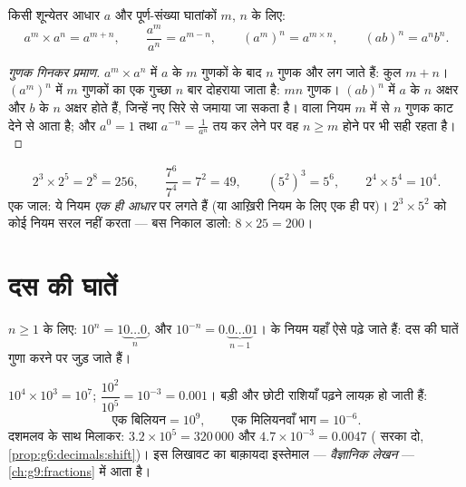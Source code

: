 \begin{theorem}[घातांक के नियम]\label{thm:g8:powers:rules}
किसी शून्येतर आधार $a$ और पूर्ण-संख्या घातांकों $m$, $n$ के लिए:
\[
a^m \times a^n = a^{m+n},
\qquad
\frac{a^m}{a^n} = a^{m-n},
\qquad
\left(a^m\right)^n = a^{m \times n},
\qquad
(ab)^n = a^n b^n .
\]
\end{theorem}

\begin{proof}[गुणक गिनकर प्रमाण]
$a^m \times a^n$ में $a$ के $m$ गुणकों के बाद $n$ गुणक और लग जाते
हैं: कुल $m + n$। $\left(a^m\right)^n$ में $m$ गुणकों का एक गुच्छा
$n$ बार दोहराया जाता है: $mn$ गुणक। $(ab)^n$ में $a$ के $n$ अक्षर
और $b$ के $n$ अक्षर होते हैं, जिन्हें नए सिरे से जमाया जा सकता है।
 वाला नियम $m$ में से $n$ गुणक काट देने से आता है; और
$a^0 = 1$ तथा $a^{-n} = \frac{1}{a^n}$ तय कर लेने पर वह $n \geq m$
होने पर भी सही रहता है।
\end{proof}

\begin{example}\label{ex:g8:powers:rules}
\[
2^3 \times 2^5 = 2^8 = 256,
\qquad
\frac{7^6}{7^4} = 7^2 = 49,
\qquad
\left(5^2\right)^3 = 5^6,
\qquad
2^4 \times 5^4 = 10^4 .
\]
एक जाल: ये नियम \emph{एक ही आधार} पर लगते हैं (या आख़िरी नियम के लिए
एक ही  पर)। $2^3 \times 5^2$ को कोई नियम सरल नहीं करता ---
बस निकाल डालो: $8 \times 25 = 200$।
\end{example}

\section{दस की घातें}

\begin{proposition}[दस की घातें]\label{prop:g8:powers:ten}
$n \geq 1$ के लिए: $10^n = 1\underbrace{0\dots0}_{n}$, और
$10^{-n} = 0.\underbrace{0\dots0}_{n-1}1$।  के नियम यहाँ ऐसे
पढ़े जाते हैं: दस की घातें गुणा करने पर  जुड़ जाते हैं।
\end{proposition}

\begin{example}\label{ex:g8:powers:ten}
$10^4 \times 10^3 = 10^7$; \quad
$\dfrac{10^2}{10^5} = 10^{-3} = 0.001$। बड़ी और छोटी राशियाँ पढ़ने
लायक़ हो जाती हैं:
\[
\text{एक बिलियन} = 10^9,
\qquad
\text{एक मिलियनवाँ भाग} = 10^{-6}.
\]
दशमलव के साथ मिलाकर: $3.2 \times 10^5 = 320\,000$ और
$4.7 \times 10^{-3} = 0.0047$ ( सरका दो,
\cref{prop:g6:decimals:shift})। इस लिखावट का बाक़ायदा इस्तेमाल ---
\emph{वैज्ञानिक लेखन} --- \cref{ch:g9:fractions} में आता है।
\end{example}

